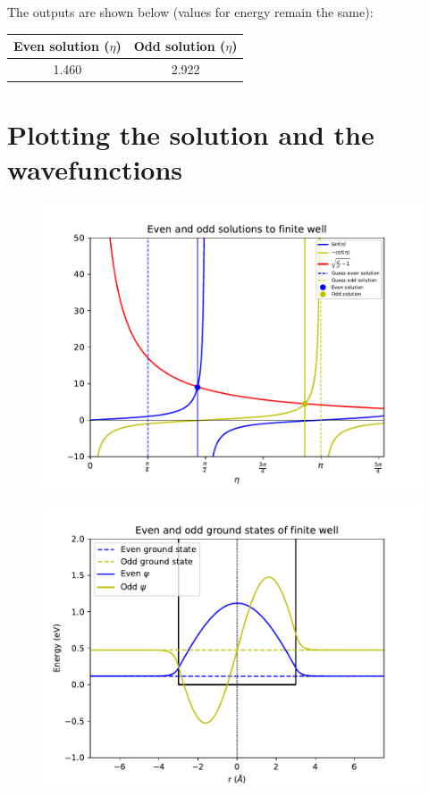 \documentclass[a4paper,10pt]{article}
\begin{document}
The outputs are shown below (values for energy remain the same): 

\begin{center}
\begin{longtable}{|c|c|}
\hline 
Even solution ($\eta$) & Odd solution ($\eta$) \\
\hline
\hline
1.460 & 2.922 \\
\hline
\end{longtable}
\end{center}

\section*{Plotting the solution and the wavefunctions}
\begin{figure}[H]
\centering
\includegraphics[scale=0.9]{transcendental_sol.pdf} 
\end{figure}

\begin{figure}[H]
\centering
\includegraphics[scale=0.9]{wavefunction_plot_zoomed.pdf} 
\end{figure}
\end{document}
